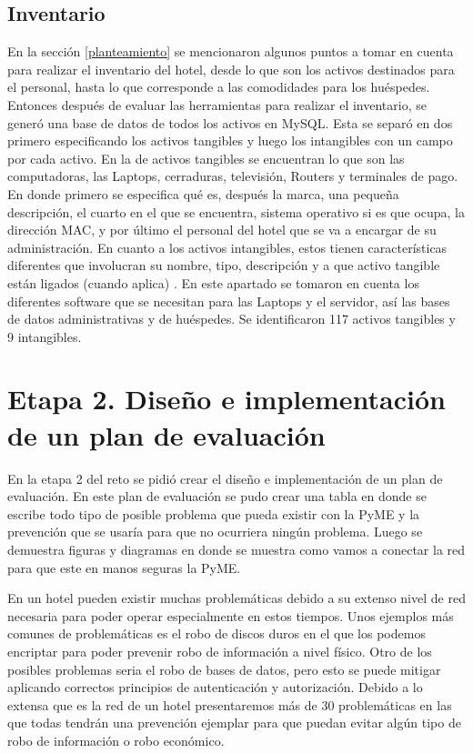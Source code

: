 \documentclass[10pt]{article}
\begin{document}
\subsection{Inventario}
En la sección \ref{planteamiento} se mencionaron algunos puntos a tomar en cuenta para realizar el inventario del hotel, desde lo que son los activos destinados para el personal, hasta lo que corresponde a las comodidades para los huéspedes. Entonces después de evaluar las herramientas para realizar el inventario, se generó una base de datos de todos los activos en MySQL. Esta se separó en dos primero especificando los activos tangibles y luego los intangibles con un campo por cada activo. En la de activos tangibles se encuentran lo que son las computadoras, las Laptops, cerraduras, televisión, Routers y terminales de pago. En donde primero se especifica qué es, después la marca, una pequeña descripción, el cuarto en el que se encuentra, sistema operativo si es que ocupa, la dirección MAC, y por último el personal del hotel que se va a encargar de su administración. En cuanto a los activos intangibles, estos tienen características diferentes que involucran su nombre, tipo, descripción y a que activo tangible están ligados (cuando aplica) . En este apartado se tomaron en cuenta los diferentes software que se necesitan para las Laptops y el servidor, así las bases de datos administrativas y de huéspedes. Se identificaron 117 activos tangibles y 9 intangibles.

\pagebreak

\section{Etapa 2. Diseño e implementación de un plan de evaluación}

En la etapa 2 del reto se pidió crear el diseño e implementación de un plan de evaluación. En este plan de evaluación se pudo crear una tabla en donde se escribe todo tipo de posible problema que pueda existir con la PyME y la prevención que se usaría para que no ocurriera ningún problema. Luego se demuestra figuras y diagramas en donde se muestra como vamos a conectar la red para que este en manos seguras la PyME. 

En un hotel pueden existir muchas problemáticas debido a su extenso nivel de red necesaria para poder operar especialmente en estos tiempos. Unos ejemplos más comunes de problemáticas es el robo de discos duros en el que los podemos encriptar para poder prevenir robo de información a nivel físico. Otro de los posibles problemas seria el robo de bases de datos, pero esto se puede mitigar aplicando correctos principios de autenticación y autorización. Debido a lo extensa que es la red de un hotel presentaremos más de 30 problemáticas en las que todas tendrán una prevención ejemplar para que puedan evitar algún tipo de robo de información o robo económico.
\end{document}
